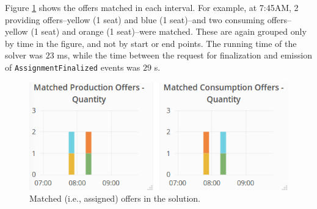 Figure \ref{fig:matches} shows the offers matched in each interval. For example, at 7:45AM, 2 providing offers--yellow (1 seat) and blue (1 seat)--and two consuming offers--yellow (1 seat) and orange (1 seat)--were matched. These are again grouped only by time in the figure, and not by start or end points. 
The running time of the solver was $23$ ms, while the time between the request for finalization and emission of \texttt{AssignmentFinalized} events was $29$ s.
%



\begin{figure}[t]
\centering
\includegraphics[width=0.9\columnwidth]{figs/matches.png}
\caption{Matched (i.e., assigned) offers in the solution.}
\label{fig:matches}
\end{figure}



